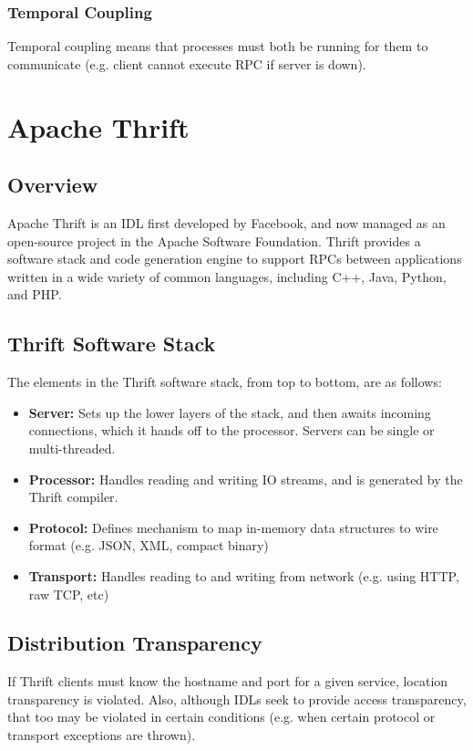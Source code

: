 \documentclass[12pt,titlepage]{article}
\let\stdsection\section
\renewcommand\section{\clearpage\stdsection}
\begin{document}
      \subsubsection{Temporal Coupling}
        Temporal coupling means that processes must both be running for them to communicate (e.g. client cannot execute RPC if server is down).

  \section{Apache Thrift}
    \subsection{Overview}
      Apache Thrift is an IDL first developed by Facebook, and now managed as an open-source project in the Apache Software Foundation. Thrift provides
      a software stack and code generation engine to support RPCs between applications written in a wide variety of common languages, including C++, Java,
      Python, and PHP.

    \subsection{Thrift Software Stack}
      The elements in the Thrift software stack, from top to bottom, are as follows:
      \begin{itemize}
        \item \textbf{Server:} Sets up the lower layers of the stack, and then awaits incoming connections, which it hands off to the processor. Servers
        can be single or multi-threaded.
        \item \textbf{Processor:} Handles reading and writing IO streams, and is generated by the Thrift compiler.
        \item \textbf{Protocol:} Defines mechanism to map in-memory data structures to wire format (e.g. JSON, XML, compact binary)
        \item \textbf{Transport:} Handles reading to and writing from network (e.g. using HTTP, raw TCP, etc)
      \end{itemize}

    \subsection{Distribution Transparency}
      If Thrift clients must know the hostname and port for a given service, location transparency is violated. Also, although IDLs seek to provide access
      transparency, that too may be violated in certain conditions (e.g. when certain protocol or transport exceptions are thrown).
\end{document}
